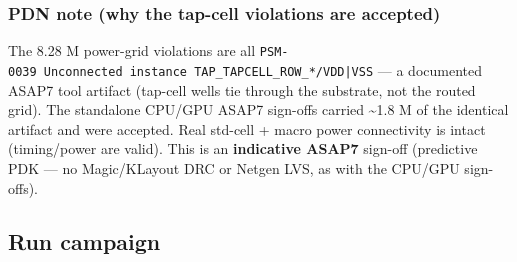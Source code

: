 \subsubsection{PDN note (why the tap-cell violations are accepted)}\label{cr:run:phase5:pdn-note-why-the-tap-cell-violations-are-accepted}

\begin{record}

The 8.28 M power-grid violations are all
\texttt{PSM-\allowbreak{}0039\ Unconnected\ instance\ TAP\_\allowbreak{}TAPCELL\_\allowbreak{}ROW\_\allowbreak{}*/\allowbreak{}VDD|VSS}
--- a documented ASAP7 tool artifact (tap-cell wells tie through the
substrate, not the routed grid). The standalone CPU/GPU ASAP7 sign-offs
carried \textasciitilde1.8 M of the identical artifact and were
accepted. Real std-cell + macro power connectivity is intact
(timing/\allowbreak{}power are valid). This is an \textbf{indicative
ASAP7} sign-off (predictive PDK --- no Magic/\allowbreak{}KLayout DRC or
Netgen LVS, as with the CPU/GPU sign-offs).

\end{record}

\subsection{Run campaign}\label{cr:run:phase5:run-campaign}


